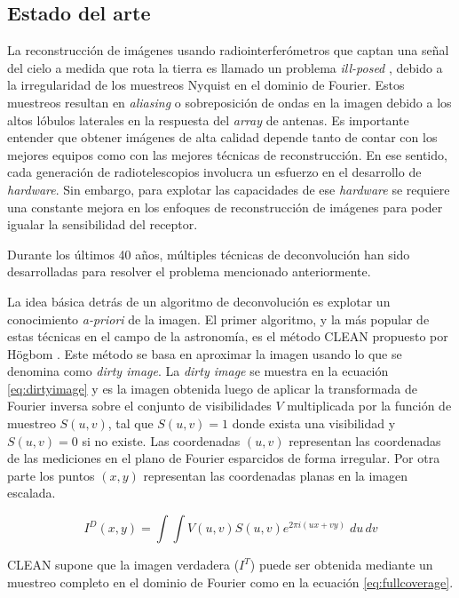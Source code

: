 \subsection{Estado del arte}
\label{sec:estadodelarte}


La reconstrucción de imágenes usando radiointerferómetros que captan una señal del cielo a medida que rota la tierra es llamado un problema \textit{ill-posed} \cite{chen}, debido a la irregularidad de los muestreos Nyquist en el dominio de Fourier. Estos muestreos resultan en \textit{aliasing} o sobreposición de ondas en la imagen debido a los altos lóbulos laterales en la respuesta del \textit{array} de antenas. Es importante entender que obtener imágenes de alta calidad depende tanto de contar con los mejores equipos como con las mejores técnicas de reconstrucción. En ese sentido, cada generación de radiotelescopios involucra un esfuerzo en el desarrollo de \textit{hardware}. Sin embargo, para explotar las capacidades de ese \textit{hardware} se requiere una constante mejora en los enfoques de reconstrucción de imágenes para poder igualar la sensibilidad del receptor.

Durante los últimos 40 años, múltiples técnicas de deconvolución han sido desarrolladas para resolver el problema mencionado anteriormente. 

La idea básica detrás de un algoritmo de deconvolución es explotar un conocimiento \textit{a-priori} de la imagen. El primer algoritmo, y la más popular de estas técnicas en el campo de la astronomía, es el método CLEAN propuesto por Högbom \cite{CLEAN}. Este método se basa en aproximar la imagen usando lo que se denomina como \textit{dirty image}. La \textit{dirty image} se muestra en la ecuación \ref{eq:dirtyimage} y es la imagen obtenida luego de aplicar la transformada de Fourier inversa sobre el conjunto de visibilidades $V$ multiplicada por la función de muestreo $S(u,v)$, tal que $S(u,v)=1$ donde exista una visibilidad y $S(u,v)=0$ si no existe. Las coordenadas $(u,v)$ representan las coordenadas de las mediciones en el plano de Fourier esparcidos de forma irregular. Por otra parte los puntos $(x,y)$ representan las coordenadas planas en la imagen escalada. 

\begin{equation}
I^{D}(x,y) = \int\int V(u,v)S(u,v)e^{2\pi i(ux+vy)}\;du\,dv
\label{eq:dirtyimage}
\end{equation}

CLEAN supone que la imagen verdadera ($I^{T}$) puede ser obtenida mediante un muestreo completo en el dominio de Fourier como en la ecuación \ref{eq:fullcoverage}.

